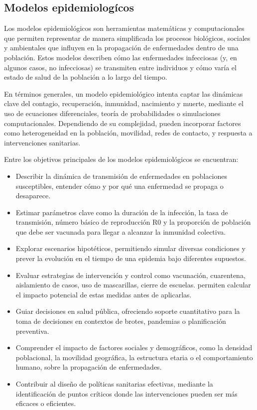 \subsection{Modelos epidemiologícos}
Los modelos epidemiológicos son herramientas matemáticas y computacionales que permiten representar de manera simplificada los procesos biológicos, sociales y ambientales que influyen en la propagación de enfermedades dentro de una población. Estos modelos describen cómo las enfermedades infecciosas (y, en algunos casos, no infecciosas) se transmiten entre individuos y cómo varía el estado de salud de la población a lo largo del tiempo.

En términos generales, un modelo epidemiológico intenta captar las dinámicas clave del contagio, recuperación, inmunidad, nacimiento y muerte, mediante el uso de ecuaciones diferenciales, teoría de probabilidades o simulaciones computacionales. Dependiendo de su complejidad, pueden incorporar factores como heterogeneidad en la población, movilidad, redes de contacto, y respuesta a intervenciones sanitarias.

Entre los objetivos principales de los modelos epidemiológicos se encuentran:
\begin{itemize}
    \item Describir la dinámica de transmisión de enfermedades en poblaciones susceptibles, entender cómo y por qué una enfermedad se propaga o desaparece.
    \item Estimar parámetros clave como la duración de la infección, la tasa de transmisión, número básico de reproducción R0 y la proporción de población que debe ser vacunada para llegar a alcanzar la inmunidad colectiva.
    \item Explorar escenarios hipotéticos, permitiendo simular diversas condiciones y prever la evolución en el tiempo de una epidemia bajo diferentes supuestos.
    \item Evaluar estrategias de intervención y control como vacunación, cuarentena, aislamiento de casos, uso de mascarillas, cierre de escuelas. permiten calcular el impacto potencial de estas medidas antes de aplicarlas.
    \item Guiar decisiones en salud pública, ofreciendo soporte cuantitativo para la toma de decisiones en contextos de brotes, pandemias o planificación preventiva.
    \item Comprender el impacto de factores sociales y demográficos, como la densidad poblacional, la movilidad geográfica, la estructura etaria o el comportamiento humano, sobre la propagación de enfermedades.
    \item Contribuir al diseño de políticas sanitarias efectivas, mediante la identificación de puntos críticos donde las intervenciones pueden ser más eficaces o eficientes.
\end{itemize}

